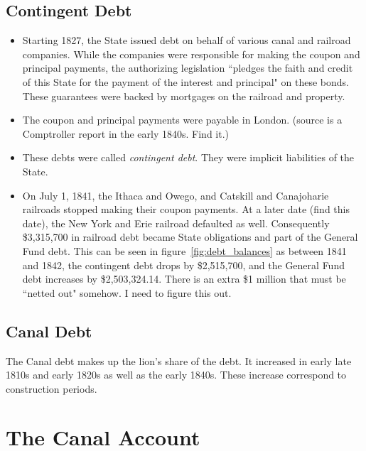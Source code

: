 \documentclass[11pt]{article}
\begin{document}
\subsection{Contingent Debt}

\begin{itemize}

\item Starting 1827, the State issued debt on behalf of various canal and 
railroad companies. While the companies were responsible for making the coupon 
and principal payments, the authorizing legislation ``pledges the faith and 
credit of this State for the payment of the interest and principal" on these 
bonds. These guarantees were backed by mortgages on the railroad and 
property.

\item The coupon and principal payments were payable in London. (source is a Comptroller report in the early 1840s.  Find it.)

\item These debts were called {\em contingent debt}. They were implicit liabilities of the State.

\item On July 1, 1841, the Ithaca and Owego, and Catskill and Canajoharie 
railroads stopped making their coupon payments. At a later date (find this 
date), the New York and Erie railroad defaulted as well. Consequently  
\$3,315,700 in railroad debt became State obligations and part of the General 
Fund debt.  This can be seen in figure~\ref{fig:debt_balances} as between 
1841 and 1842, the contingent debt drops by \$2,515,700, and the General 
Fund debt increases by  \$2,503,324.14. There is an extra \$1 million that 
must be ``netted out" somehow.  I need to figure this out.


\end{itemize}


\subsection{Canal Debt}

The Canal debt makes up the lion's share of the debt.  It increased in early late 1810s and early 1820s as well as the early 1840s.  These increase correspond to construction periods.

\newpage

\section{The Canal Account}
\end{document}
